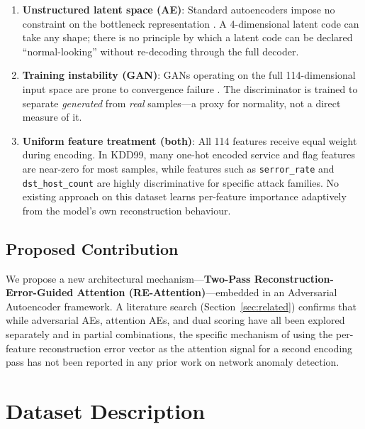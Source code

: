 \documentclass[12pt,a4paper]{article}
\begin{document}
\begin{enumerate}[leftmargin=2em]
    \item \textbf{Unstructured latent space (AE)}: Standard autoencoders impose
          no constraint on the bottleneck representation \citep{ae_analysis_nids}.
          A 4-dimensional latent code can take any shape; there is no principle
          by which a latent code can be declared ``normal-looking'' without
          re-decoding through the full decoder.
    \item \textbf{Training instability (GAN)}: GANs operating on the full
          114-dimensional input space are prone to convergence failure
          \citep{alad}. The discriminator is trained to separate
          \emph{generated} from \emph{real} samples---a proxy for normality,
          not a direct measure of it.
    \item \textbf{Uniform feature treatment (both)}: All 114 features receive
          equal weight during encoding. In KDD99, many one-hot encoded service
          and flag features are near-zero for most samples, while features such
          as \texttt{serror\_rate} and \texttt{dst\_host\_count} are highly
          discriminative for specific attack families. No existing approach on
          this dataset learns per-feature importance adaptively from the
          model's own reconstruction behaviour.
\end{enumerate}

\subsection{Proposed Contribution}

We propose a new architectural mechanism---\textbf{Two-Pass
Reconstruction-Error-Guided Attention (RE-Attention)}---embedded in an
Adversarial Autoencoder framework. A literature search (Section~\ref{sec:related})
confirms that while adversarial AEs, attention AEs, and dual scoring have all
been explored separately and in partial combinations, the specific mechanism of
using the per-feature reconstruction error vector as the attention signal for a
second encoding pass has not been reported in any prior work on network anomaly
detection.

\section{Dataset Description}
\end{document}
